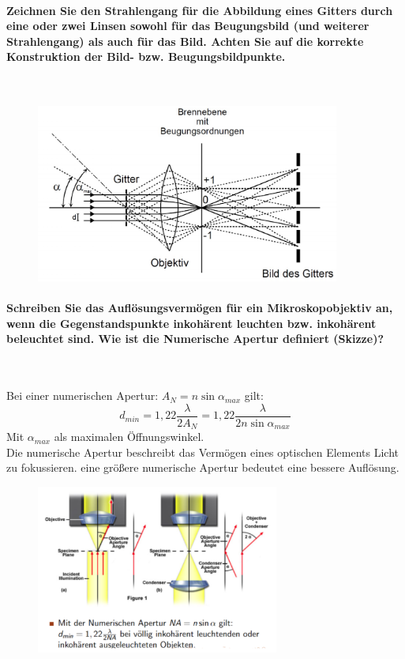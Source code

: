 \documentclass[a4paper, 11pt, ngerman, parskip=half-]{scrartcl}
\begin{document}
    \paragraph{Zeichnen Sie den Strahlengang für die Abbildung eines Gitters durch eine oder zwei Linsen
        sowohl für das Beugungsbild (und weiterer Strahlengang) als auch für das Bild. Achten Sie
        auf die korrekte Konstruktion der Bild- bzw. Beugungsbildpunkte.} ~

    \begin{figure}[H]
        \centering
        \includegraphics[width=10cm]{image/22/Gitter_Strahlengang.png}
    \end{figure}

    \paragraph{Schreiben Sie das Auflösungsvermögen für ein Mikroskopobjektiv an, wenn die
        Gegenstandspunkte inkohärent leuchten bzw. inkohärent beleuchtet sind. Wie ist die Numerische
        Apertur definiert (Skizze)?} ~

    Bei einer numerischen Apertur: $A_N = n \sin \alpha_{max}$ gilt:
    \begin{equation}
        d_{min} = 1,22 \frac{\lambda}{2 A_N} = 1,22 \frac{\lambda}{2 n \sin \alpha_{max}}
    \end{equation}
    Mit $\alpha_{max}$ als maximalen Öffnungswinkel.\\
    Die numerische Apertur beschreibt das Vermögen eines optischen Elements Licht zu fokussieren. eine größere numerische Apertur
    bedeutet eine bessere Auflösung.
    \begin{figure}[H]
        \centering
        \includegraphics[width=8cm]{image/22/opt25}
    \end{figure}
\end{document}
